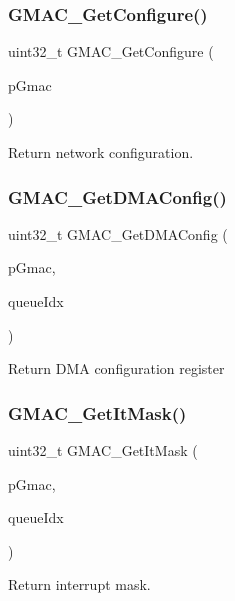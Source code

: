 \subsubsection{\texorpdfstring{GMAC\_GetConfigure()}{GMAC\_GetConfigure()}}
{\footnotesize\ttfamily uint32\+\_\+t G\+M\+A\+C\+\_\+\+Get\+Configure (\begin{DoxyParamCaption}\item[{\mbox{\hyperlink{structGmac}{Gmac}} $\ast$}]{p\+Gmac }\end{DoxyParamCaption})}

Return network configuration. \mbox{\label{group__gmac__defines_gad60942eb57cf6c8f9b4cc3e527f58fa7}} 
\subsubsection{\texorpdfstring{GMAC\_GetDMAConfig()}{GMAC\_GetDMAConfig()}}
{\footnotesize\ttfamily uint32\+\_\+t G\+M\+A\+C\+\_\+\+Get\+D\+M\+A\+Config (\begin{DoxyParamCaption}\item[{\mbox{\hyperlink{structGmac}{Gmac}} $\ast$}]{p\+Gmac,  }\item[{gmac\+Que\+List\+\_\+t}]{queue\+Idx }\end{DoxyParamCaption})}

Return D\+MA configuration register \mbox{\label{group__gmac__defines_ga3b19788339e3ea42396e5dac9ae4764f}} 
\subsubsection{\texorpdfstring{GMAC\_GetItMask()}{GMAC\_GetItMask()}}
{\footnotesize\ttfamily uint32\+\_\+t G\+M\+A\+C\+\_\+\+Get\+It\+Mask (\begin{DoxyParamCaption}\item[{\mbox{\hyperlink{structGmac}{Gmac}} $\ast$}]{p\+Gmac,  }\item[{gmac\+Que\+List\+\_\+t}]{queue\+Idx }\end{DoxyParamCaption})}

Return interrupt mask. \mbox{\label{group__gmac__defines_ga9e845a27fa9a4f30f4f53684ca5934c5}} 

